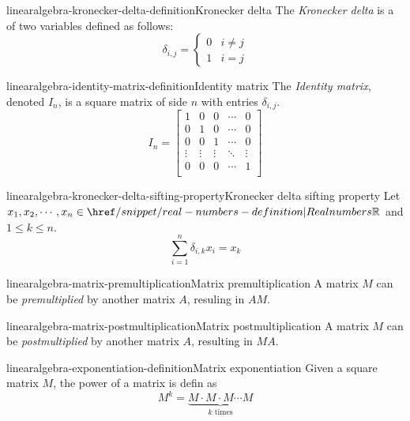 \documentclass[preview]{standalone}
\begin{document}
\begin{snippetdefinition}{linearalgebra-kronecker-delta-definition}{Kronecker delta}
    The \textit{Kronecker delta} is a \function of two variables
    defined as follows:
    \[
        \delta_{i,j} = \begin{cases}
            0 & i \neq j \\
            1 & i = j
        \end{cases}
    \]
\end{snippetdefinition}

\begin{snippetdefinition}{linearalgebra-identity-matrix-definition}{Identity matrix}
    The \textit{Identity matrix}, denoted \(I_n\),
    is a square matrix of side \(n\)
    with entries \(\delta_{i,j}\).
    \[
    I_n=
        \begin{bmatrix}
            1 & 0 & 0 & \cdots & 0 \\
            0 & 1 & 0 & \cdots & 0 \\
            0 & 0 & 1 & \cdots & 0 \\
            \vdots & \vdots & \vdots & \ddots & \vdots \\
            0 & 0 & 0 & \cdots & 1 \\
        \end{bmatrix}
    \]
\end{snippetdefinition}

\begin{snippetproposition}{linearalgebra-kronecker-delta-sifting-property}{Kronecker delta sifting property}
    Let \(x_1, x_2, \cdots, x_n \in \realnumbers\)
    and \(1 \leq k \leq n\).
    \[
        \sum_{i=1}^n \delta_{i,k}x_i = x_k
    \]
\end{snippetproposition}

\begin{snippetdefinition}{linearalgebra-matrix-premultiplication}{Matrix premultiplication}
    A matrix \(M\) can be \textit{premultiplied}
    by another matrix \(A\), resuling in \(AM\).
\end{snippetdefinition}

\begin{snippetdefinition}{linearalgebra-matrix-postmultiplication}{Matrix postmultiplication}
    A matrix \(M\) can be \textit{postmultiplied}
    by another matrix \(A\), resulting in \(MA\).
\end{snippetdefinition}

\begin{snippetdefinition}{linearalgebra-exponentiation-definition}{Matrix exponentiation}
    Given a square matrix \(M\), the power of a matrix
    is defin as
    \[
        M^k = \underbrace{M\cdot M \cdot M \cdots M}_{k \text{ times}}
    \]
\end{snippetdefinition}
\end{document}
